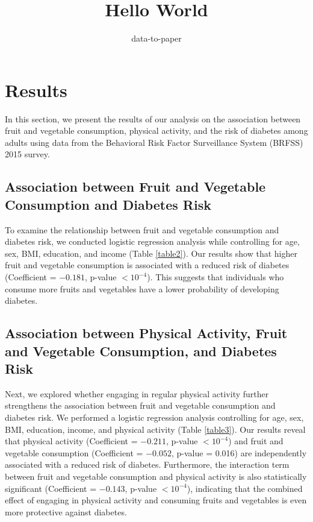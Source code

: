 \documentclass[12pt]{article}
\title{Hello World}
\author{data-to-paper}
\begin{document}
\maketitle

\section{Results}

In this section, we present the results of our analysis on the association between fruit and vegetable consumption, physical activity, and the risk of diabetes among adults using data from the Behavioral Risk Factor Surveillance System (BRFSS) 2015 survey.

\subsection{Association between Fruit and Vegetable Consumption and Diabetes Risk}

To examine the relationship between fruit and vegetable consumption and diabetes risk, we conducted logistic regression analysis while controlling for age, sex, BMI, education, and income (Table \ref{table2}). Our results show that higher fruit and vegetable consumption is associated with a reduced risk of diabetes (Coefficient = $-0.181$, p-value $<10^{-4}$). This suggests that individuals who consume more fruits and vegetables have a lower probability of developing diabetes.

\subsection{Association between Physical Activity, Fruit and Vegetable Consumption, and Diabetes Risk}

Next, we explored whether engaging in regular physical activity further strengthens the association between fruit and vegetable consumption and diabetes risk. We performed a logistic regression analysis controlling for age, sex, BMI, education, income, and physical activity (Table \ref{table3}). Our results reveal that physical activity (Coefficient = $-0.211$, p-value $<10^{-4}$) and fruit and vegetable consumption (Coefficient = $-0.052$, p-value = 0.016) are independently associated with a reduced risk of diabetes. Furthermore, the interaction term between fruit and vegetable consumption and physical activity is also statistically significant (Coefficient = $-0.143$, p-value $<10^{-4}$), indicating that the combined effect of engaging in physical activity and consuming fruits and vegetables is even more protective against diabetes.
\end{document}
